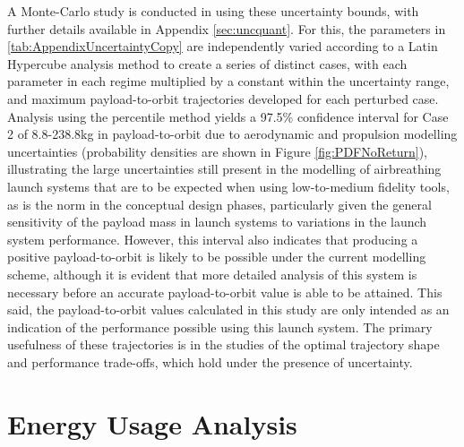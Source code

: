 A Monte-Carlo study is conducted in using these uncertainty bounds, with further details available in Appendix \ref{sec:uncquant}. For this, the parameters in \ref{tab:AppendixUncertaintyCopy} are independently varied according to a Latin Hypercube analysis method to create a series of distinct cases, with each parameter in each regime multiplied by a constant within the uncertainty range, and maximum payload-to-orbit trajectories developed for each perturbed case. 
Analysis using the percentile method yields a 97.5\% confidence interval for Case 2 of 8.8-238.8kg in payload-to-orbit due to aerodynamic and propulsion modelling uncertainties (probability densities are shown in Figure \ref{fig:PDFNoReturn}), illustrating the large uncertainties still present in the modelling of airbreathing launch systems that are to be expected when using low-to-medium fidelity tools, as is the norm in the conceptual design phases, particularly given the general sensitivity of the payload mass in launch systems to variations in the launch system performance. However, this interval also indicates that producing a positive payload-to-orbit is likely to be possible under the current modelling scheme, although it is evident that more detailed analysis of this system is necessary before an accurate payload-to-orbit value is able to be attained. This said, the payload-to-orbit values calculated in this study are only intended as an indication of the performance possible using this launch system. The primary usefulness of these trajectories is in the studies of the optimal trajectory shape and performance trade-offs, which hold under the presence of uncertainty. 

\section{Energy Usage Analysis}\label{sec:exergy1}




